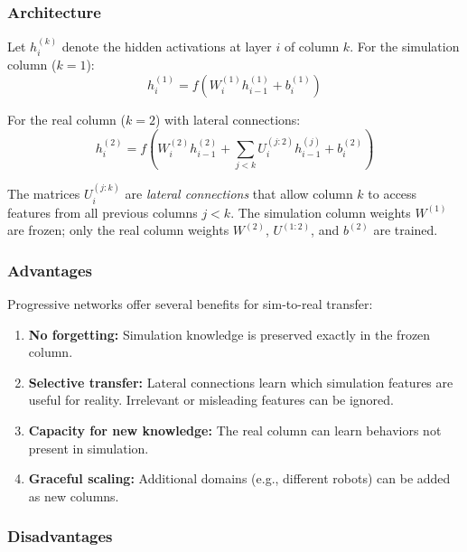 \subsubsection{Architecture}

Let $h_i^{(k)}$ denote the hidden activations at layer $i$ of column $k$. For the simulation column ($k=1$):
\begin{equation}
h_i^{(1)} = f(W_i^{(1)} h_{i-1}^{(1)} + b_i^{(1)})
\end{equation}

For the real column ($k=2$) with lateral connections:
\begin{equation}
h_i^{(2)} = f\left(W_i^{(2)} h_{i-1}^{(2)} + \sum_{j<k} U_i^{(j:2)} h_{i-1}^{(j)} + b_i^{(2)}\right)
\label{eq:progressive_layer}
\end{equation}

The matrices $U_i^{(j:k)}$ are \textit{lateral connections} that allow column $k$ to access features from all previous columns $j < k$. The simulation column weights $W^{(1)}$ are frozen; only the real column weights $W^{(2)}$, $U^{(1:2)}$, and $b^{(2)}$ are trained.

\subsubsection{Advantages}

Progressive networks offer several benefits for sim-to-real transfer:

\begin{enumerate}
    \item \textbf{No forgetting:} Simulation knowledge is preserved exactly in the frozen column.

    \item \textbf{Selective transfer:} Lateral connections learn which simulation features are useful for reality. Irrelevant or misleading features can be ignored.

    \item \textbf{Capacity for new knowledge:} The real column can learn behaviors not present in simulation.

    \item \textbf{Graceful scaling:} Additional domains (e.g., different robots) can be added as new columns.
\end{enumerate}

\subsubsection{Disadvantages}

